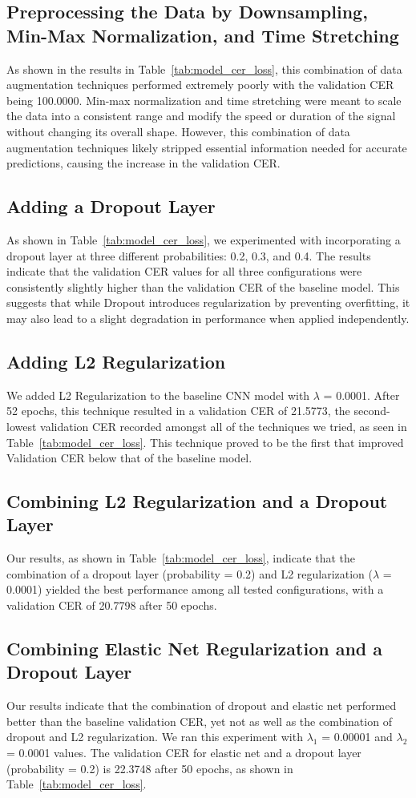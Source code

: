\documentclass{article}
\begin{document}
\subsection{Preprocessing the Data by Downsampling, Min-Max Normalization, and Time Stretching}
As shown in the results in {Table~\ref{tab:model_cer_loss}}, this combination of data augmentation techniques performed extremely poorly with the validation CER being 100.0000. Min-max normalization and time stretching were meant to scale the data into a consistent range and modify the speed or duration of the signal without changing its overall shape.  However, this combination of data augmentation techniques likely stripped essential information needed for accurate predictions, causing the increase in the validation CER. 
\subsection{Adding a Dropout Layer}
As shown in {Table~\ref{tab:model_cer_loss}}, we experimented with incorporating a dropout layer at three different probabilities: 0.2, 0.3, and 0.4. The results indicate that the validation CER values for all three configurations were consistently slightly higher than the validation CER of the baseline model. This suggests that while Dropout introduces regularization by preventing overfitting, it may also lead to a slight degradation in performance when applied independently.

\subsection{Adding L2 Regularization}
We added L2 Regularization to the baseline CNN model with $\lambda$ = 0.0001. After 52 epochs, this technique resulted in a validation CER of 21.5773, the second-lowest validation CER recorded amongst all of the techniques we tried, as seen in {Table~\ref{tab:model_cer_loss}}. This technique proved to be the first that improved Validation CER below that of the baseline model.
\subsection{Combining L2 Regularization and a Dropout Layer}
Our results, as shown in {Table~\ref{tab:model_cer_loss}}, indicate that the combination of a dropout layer (probability = 0.2) and L2 regularization ($\lambda$ = 0.0001) yielded the best performance among all tested configurations, with a validation CER of 20.7798 after 50 epochs. 
\subsection{Combining Elastic Net Regularization and a Dropout Layer}
Our results indicate that the combination of dropout and elastic net performed better than the baseline validation CER, yet not as well as the combination of dropout and L2 regularization. We ran this experiment with $\lambda_{1}$ = 0.00001 and $\lambda_2$ = 0.0001 values. The validation CER for elastic net and a dropout layer (probability = 0.2) is 22.3748 after 50 epochs, as shown in {Table~\ref{tab:model_cer_loss}}.
\end{document}
